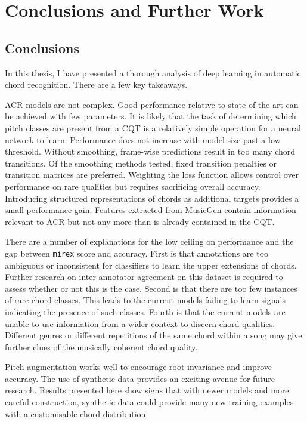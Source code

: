 
\chapter{Conclusions and Further Work}

\section{Conclusions}

In this thesis, I have presented a thorough analysis of deep learning in automatic chord recognition. There are a few key takeaways.

ACR models are not complex. Good performance relative to state-of-the-art can be achieved with few parameters. It is likely that the task of determining which pitch classes are present from a CQT is a relatively simple operation for a neural network to learn. Performance does not increase with model size past a low threshold. Without smoothing, frame-wise predictions result in too many chord transitions. Of the smoothing methods tested, fixed transition penalties or transition matrices are preferred. Weighting the loss function allows control over performance on rare qualities but requires sacrificing overall accuracy. Introducing structured representations of chords as additional targets provides a small performance gain. Features extracted from MusicGen contain information relevant to ACR but not any more than is already contained in the CQT.

There are a number of explanations for the low ceiling on performance and the gap between \texttt{mirex} score and accuracy. First is that annotations are too ambiguous or inconsistent for classifiers to learn the upper extensions of chords. Further research on inter-annotator agreement on this dataset is required to assess whether or not this is the case. Second is that there are too few instances of rare chord classes. This leads to the current models failing to learn signals indicating the presence of such classes. Fourth is that the current models are unable to use information from a wider context to discern chord qualities. Different genres or different repetitions of the same chord within a song may give further clues of the musically coherent chord quality.

Pitch augmentation works well to encourage root-invariance and improve accuracy. The use of synthetic data provides an exciting avenue for future research. Results presented here show signs that with newer models and more careful construction, synthetic data could provide many new training examples with a customisable chord distribution.

